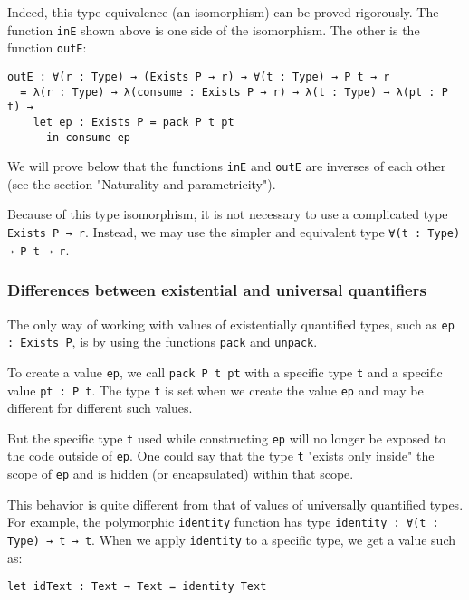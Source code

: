 Indeed, this type equivalence (an isomorphism) can be proved rigorously.
The function \lstinline!inE! shown above is one side of the isomorphism.
The other is the function \lstinline!outE!:


\begin{lstlisting}[language=Dhall]
outE : ∀(r : Type) → (Exists P → r) → ∀(t : Type) → P t → r
  = λ(r : Type) → λ(consume : Exists P → r) → λ(t : Type) → λ(pt : P t) →
    let ep : Exists P = pack P t pt
      in consume ep
\end{lstlisting}


We will prove below that the functions \lstinline!inE! and \lstinline!outE! are inverses of each other (see the section "Naturality and parametricity").


Because of this type isomorphism, it is not necessary to use a complicated type \lstinline!Exists P → r!.
Instead, we may use the simpler and equivalent type \lstinline!∀(t : Type) → P t → r!.


\subsubsection{Differences between existential and universal quantifiers}


The only way of working with values of existentially quantified types, such as \lstinline!ep : Exists P!, is by using the functions \lstinline!pack! and \lstinline!unpack!.


To create a value \lstinline!ep!, we call \lstinline!pack P t pt! with a specific type \lstinline!t! and a specific value \lstinline!pt : P t!.
The type \lstinline!t! is set when we create the value \lstinline!ep! and may be different for different such values.


But the specific type \lstinline!t! used while constructing \lstinline!ep! will no longer be exposed to the code outside of \lstinline!ep!.
One could say that the type \lstinline!t! "exists only inside" the scope of \lstinline!ep! and is hidden (or encapsulated) within that scope.


This behavior is quite different from that of values of universally quantified types.
For example, the polymorphic \lstinline!identity! function has type \lstinline!identity : ∀(t : Type) → t → t!.
When we apply \lstinline!identity! to a specific type, we get a value such as:


\begin{lstlisting}[language=Dhall]
let idText : Text → Text = identity Text
\end{lstlisting}



